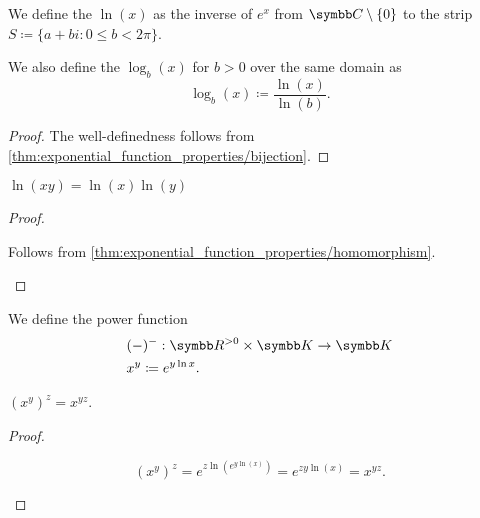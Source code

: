 \begin{definition}\label{def:logarithm}
  We define the  \( \ln(x) \) as the inverse of \( e^x \) from \( \BC \setminus \{ 0 \} \) to the strip \( S \coloneqq \{ a + bi \colon 0 \leq b < 2\pi \} \).

  We also define the  \( \log_b(x) \) for \( b > 0 \) over the same domain as
  \begin{equation*}
    \log_b(x) \coloneqq \frac {\ln(x)} {\ln(b)}.
  \end{equation*}
\end{definition}
\begin{proof}
  The well-definedness follows from \cref{thm:exponential_function_properties/bijection}.
\end{proof}

\begin{proposition}\label{thm:logarithm_properties}
  \mbox{}
  \begin{thmenum}
     \( \ln(xy) = \ln(x) \ln(y) \)
  \end{thmenum}
\end{proposition}
\begin{proof}
  \begin{description}
     Follows from \cref{thm:exponential_function_properties/homomorphism}.
  \end{description}
\end{proof}

\begin{definition}\label{def:power_function}
  We define the power function
  \begin{align*}
    &(-)^{-}: \BR^{>0} \times \BK \to \BK \\
    &x^y \coloneqq e^{y \ln x}.
  \end{align*}
\end{definition}

\begin{proposition}\label{thm:power_function_properties}
  \mbox{}
  \begin{thmenum}
     \( (x^y)^z = x^{yz} \).
  \end{thmenum}
\end{proposition}
\begin{proof}
  \begin{description}
    \begin{equation*}
      (x^y)^z
      =
      e^{z \ln(e^{y \ln(x)})}
      =
      e^{z y \ln(x)}
      =
      x^{yz}.
    \end{equation*}
  \end{description}
\end{proof}

